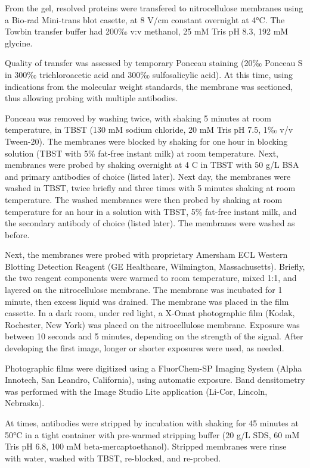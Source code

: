 \documentclass[12pt,english]{report}\usepackage[]{graphicx}\usepackage[]{color}
\begin{document}
From the gel, resolved proteins were transfered to nitrocellulose
membranes using a Bio-rad Mini-trans blot casette, at 8 V/cm constant
overnight at 4°C. The Towbin transfer buffer had 200‰ v:v methanol,
25 mM Tris pH 8.3, 192 mM glycine.

Quality of transfer was assessed by temporary Ponceau staining (20‰
Ponceau S in 300‰ trichloroacetic acid and 300‰ sulfosalicylic acid).
At this time, using indications from the molecular weight standards,
the membrane was sectioned, thus allowing probing with multiple antibodies.

Ponceau was removed by washing twice, with shaking 5 minutes at room
temperature, in TBST (130 mM sodium chloride, 20 mM Tris pH 7.5, 1‰
v/v Tween-20). The membranes were blocked by shaking for one hour
in blocking solution (TBST with 5\% fat-free instant milk) at room
temperature. Next, membranes were probed by shaking overnight at 4
C in TBST with 50 g/L BSA and primary antibodies of choice (listed
later). Next day, the membranes were washed in TBST, twice briefly
and three times with 5 minutes shaking at room temperature. The washed
membranes were then probed by shaking at room temperature for an hour
in a solution with TBST, 5\% fat-free instant milk, and the secondary
antibody of choice (listed later). The membranes were washed as before.

Next, the membranes were probed with proprietary Amersham ECL Western
Blotting Detection Reagent (GE Healthcare, Wilmington, Massachusetts).
Briefly, the two reagent components were warmed to room temperature,
mixed 1:1, and layered on the nitrocellulose membrane. The membrane
was incubated for 1 minute, then excess liquid was drained. The membrane
was placed in the film cassette. In a dark room, under red light,
a X-Omat photographic film (Kodak, Rochester, New York) was placed
on the nitrocellulose membrane. Exposure was between 10 seconds and
5 minutes, depending on the strength of the signal. After developing
the first image, longer or shorter exposures were used, as needed.

Photographic films were digitized using a FluorChem-SP Imaging System
(Alpha Innotech, San Leandro, California), using automatic exposure.
Band densitometry was performed with the Image Studio Lite application
(Li-Cor, Lincoln, Nebraska).

At times, antibodies were stripped by incubation with shaking for
45 minutes at 50°C in a tight container with pre-warmed stripping
buffer (20 g/L SDS, 60 mM Tris pH 6.8, 100 mM beta-mercaptoethanol).
Stripped membranes were rinse with water, washed with TBST, re-blocked,
and re-probed.
\end{document}

